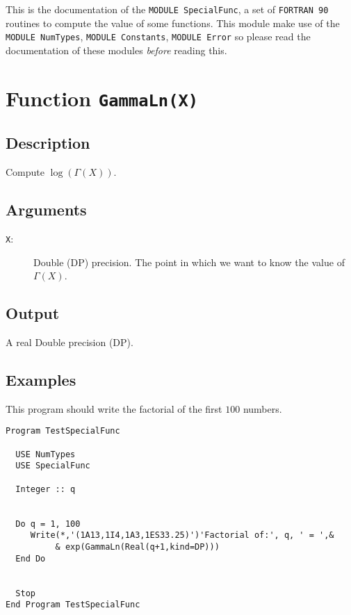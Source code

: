 This is the documentation of the \texttt{MODULE SpecialFunc}, a set
of \texttt{FORTRAN 90} routines to compute the value of some
functions. This module make use of the \texttt{MODULE NumTypes},
\texttt{MODULE Constants}, \texttt{MODULE Error} so please read the
documentation of these modules \emph{before} reading this.

\section{Function \texttt{GammaLn(X)}}

\subsection{Description}

Compute $\log(\Gamma(X))$.

\subsection{Arguments}

\begin{description}
\item[\texttt{X}:] Double (DP) precision. The point in which we want to
  know the value of $\Gamma(X)$.
\end{description}

\subsection{Output}

A real Double precision (DP).

\subsection{Examples}

This program should write the factorial of the first $100$ numbers.

\begin{verbatim}
Program TestSpecialFunc

  USE NumTypes
  USE SpecialFunc

  Integer :: q


  Do q = 1, 100
     Write(*,'(1A13,1I4,1A3,1ES33.25)')'Factorial of:', q, ' = ',&
          & exp(GammaLn(Real(q+1,kind=DP)))
  End Do


  Stop
End Program TestSpecialFunc

\end{verbatim}


